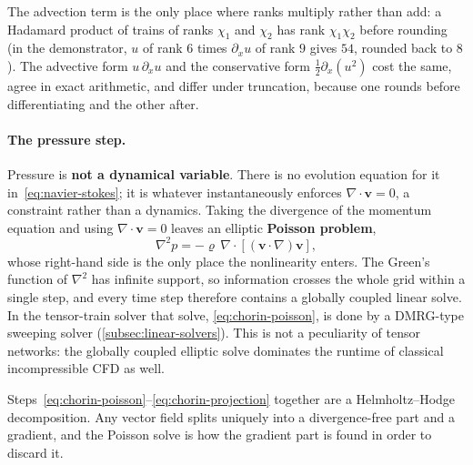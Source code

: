 \begin{remark}
  The advection term is the only place where ranks multiply rather than add: a
  Hadamard product of trains of ranks $\chi_1$ and $\chi_2$ has rank
  $\chi_1\chi_2$ before rounding (in the demonstrator, $u$ of rank $6$ times
  $\partial_x u$ of rank $9$ gives $54$, rounded back to $8$). The advective
  form $u\,\partial_x u$ and the conservative form
  $\tfrac12\partial_x(u^2)$ cost the same, agree in exact arithmetic, and
  differ under truncation, because one rounds before differentiating and the
  other after.
\end{remark}

\paragraph{The pressure step.}
Pressure is \textbf{not a dynamical variable}. There is no evolution equation
for it in~\eqref{eq:navier-stokes}; it is whatever instantaneously enforces
$\nabla\cdot\mathbf{v} = 0$, a constraint rather than a dynamics. Taking the
divergence of the momentum equation and using $\nabla\cdot\mathbf{v} = 0$
leaves an elliptic \textbf{Poisson problem},
\begin{equation}
  \nabla^2 p = -\varrho\, \nabla\cdot\!\left[(\mathbf{v}\cdot\nabla)\mathbf{v}\right],
  \label{eq:pressure-poisson}
\end{equation}
whose right-hand side is the only place the nonlinearity enters. The Green's
function of $\nabla^2$ has infinite support, so information crosses the whole
grid within a single step, and every time step therefore contains a globally
coupled linear solve. In the tensor-train solver that solve,
\eqref{eq:chorin-poisson}, is done by a DMRG-type sweeping solver
(\cref{subsec:linear-solvers}). This is not a peculiarity of tensor networks:
the globally coupled elliptic solve dominates the runtime of classical
incompressible CFD as well.

Steps~\eqref{eq:chorin-poisson}--\eqref{eq:chorin-projection} together are a
Helmholtz--Hodge decomposition. Any vector field splits uniquely into a
divergence-free part and a gradient, and the Poisson solve is how the gradient
part is found in order to discard it.

